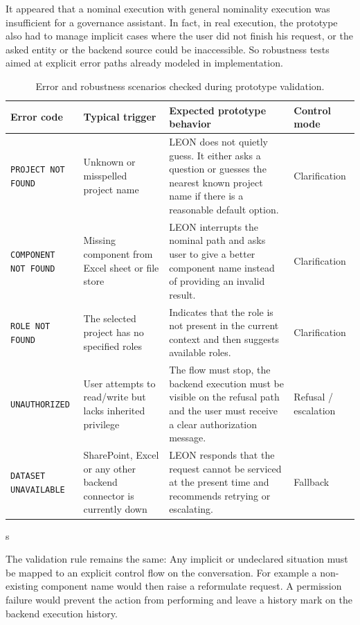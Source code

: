 It appeared that a nominal execution with general nominality execution was insufficient for a governance assistant. In fact, in real execution, the prototype also had to manage implicit cases where the user did not finish his request, or the asked entity or the backend source could be inaccessible. So robustness tests aimed at explicit error paths already modeled in implementation.
\begin{table}[H]
\centering
\footnotesize
\renewcommand{\arraystretch}{1.25}
\caption{Error and robustness scenarios checked during prototype validation.}
\label{tab:robustness-validation-scenarios}
\begin{tabularx}{\textwidth}{|p{3cm}|p{2.7cm}|X|p{2.2cm}|}
\hline
\rowcolor[HTML]{E6F2FF}\textcolor[HTML]{003D99}{\textbf{Error code}} & \textcolor[HTML]{003D99}{\textbf{Typical trigger}} & \textcolor[HTML]{003D99}{\textbf{Expected prototype behavior}} & \textcolor[HTML]{003D99}{\textbf{Control mode}} \\
\hline
\texttt{PROJECT NOT FOUND} & Unknown or misspelled project name & LEON does not quietly guess. It either asks a question or guesses the nearest known project name if there is a reasonable default option. & Clarification \\
\hline
\texttt{COMPONENT NOT FOUND} & Missing component from Excel sheet or file store & LEON interrupts the nominal path and asks user to give a better component name instead of providing an invalid result. & Clarification \\
\hline
\texttt{ROLE NOT FOUND} & The selected project has no specified roles & Indicates that the role is not present in the current context and then suggests available roles. & Clarification \\
\hline
\texttt{UNAUTHORIZED} & User attempts to read/write but lacks inherited privilege & The flow must stop, the backend execution must be visible on the refusal path and  the user must receive a clear authorization message. & Refusal / escalation \\
\hline
\texttt{DATASET UNAVAILABLE} & SharePoint, Excel or any other backend connector is currently down & LEON responds that the request cannot be serviced at the present time and recommends retrying or escalating. & Fallback \\
\hline
\end{tabularx}s
\end{table}

The validation rule remains the same: Any implicit or undeclared situation must be mapped to an explicit control flow on the conversation. For example a non-existing component name would then raise a reformulate request. A permission failure would prevent the action from performing and leave a history mark on the backend execution history.



